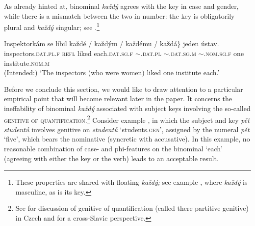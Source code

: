 \documentclass[output=paper,colorlinks,citecolor=brown,newtxmath]{langscibook}
\begin{document}
\ea\label{ex:share-subject}
\z\z

\noindent As already hinted at, binominal \textit{každý} agrees with the key in case and gender, while there is a mismatch between the two in number: the key is obligatorily plural and \textit{každý} singular; see .\footnote{These properties are shared with floating \textit{každý;} see example , where \textit{každý} is masculine, as is its key.}

\ea\label{ex:phi}\gll Inspektorkám se líbil \minsp{\{} každé / \minsp{*} každým / \minsp{*} každému /\hspace{0.3cm} \minsp{*} každá\} jeden ústav.\\
inspectors.\textsc{dat.pl.f} \textsc{refl} liked {} each.\textsc{dat.sg.f} {} {} $\sim$.\textsc{dat.pl} {} {} $\sim$.\textsc{dat.sg.m} {} {} $\sim$.\textsc{nom.sg.f} one institute.\textsc{nom.m}\\
\glt (Intended:) `The inspectors (who were women) liked one institute each.'
\z

\noindent Before we conclude this section, we would like to draw attention to a particular empirical point that will become relevant later in the paper. It concerns the ineffability of binominal \textit{každý} associated with subject keys involving the so-called \textsc{genitive of quantification}.\footnote{See \citet[Chapter 8]{Veselovska1995} for discussion of genitive of quantification (called there partitive genitive) in Czech and \citet{Franks1994} for a cross-Slavic perspective.} Consider example , in which the subject and key \textit{pět studentů} involves genitive on \textit{studentů} `students.\textsc{gen}', assigned by the numeral \textit{pět} `five', which bears the nominative (syncretic with accusative). In this example, no reasonable combination of case- and phi-features on the binominal `each' (agreeing with either the key or the verb) leads to an acceptable result.

\z
\end{document}
